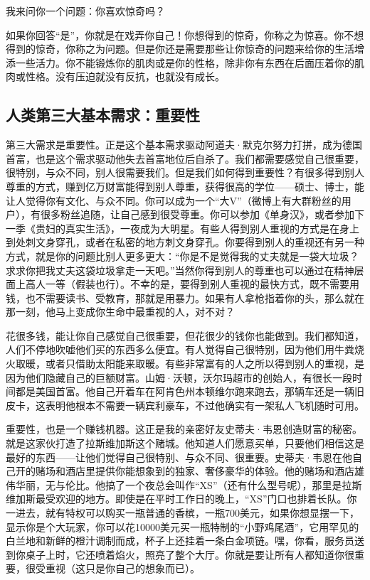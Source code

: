 我来问你一个问题：你喜欢惊奇吗？

如果你回答“是”，你就是在戏弄你自己！你想得到的惊奇，你称之为惊喜。你不想得到的惊奇，你称之为问题。但是你还是需要那些让你惊奇的问题来给你的生活增添一些活力。你不能锻炼你的肌肉或是你的性格，除非你有东西在后面压着你的肌肉或性格。没有压迫就没有反抗，也就没有成长。

\subsection{人类第三大基本需求：重要性}

第三大需求是重要性。正是这个基本需求驱动阿道夫·默克尔努力打拼，成为德国首富，也是这个需求驱动他失去首富地位后自杀了。我们都需要感觉自己很重要，很特别，与众不同，别人很需要我们。但是我们如何得到重要性？有很多得到别人尊重的方式，赚到亿万财富能得到别人尊重，获得很高的学位——硕士、博士，能让人觉得你有文化、与众不同。你可以成为一个“大V”（微博上有大群粉丝的用户），有很多粉丝追随，让自己感到很受尊重。你可以参加《单身汉》，或者参加下一季《贵妇的真实生活》，一夜成为大明星。有些人得到别人重视的方式是在身上到处刺文身穿孔，或者在私密的地方刺文身穿孔。你要得到别人的重视还有另一种方式，就是你的问题比别人更多更大：“你是不是觉得我的丈夫就是一袋大垃圾？求求你把我丈夫这袋垃圾拿走一天吧。”当然你得到别人的尊重也可以通过在精神层面上高人一等（假装也行）。不幸的是，要得到别人重视的最快方式，既不需要用钱，也不需要读书、受教育，那就是用暴力。如果有人拿枪指着你的头，那么就在那一刻，他马上变成你生命中最重视的人，对不对？

花很多钱，能让你自己感觉自己很重要，但花很少的钱你也能做到。我们都知道，人们不停地吹嘘他们买的东西多么便宜。有人觉得自己很特别，因为他们用牛粪烧火取暖，或者只借助太阳能来取暖。有些非常富有的人之所以得到别人的重视，是因为他们隐藏自己的巨额财富。山姆·沃顿，沃尔玛超市的创始人，有很长一段时间都是美国首富。他自己开着车在阿肯色州本顿维尔跑来跑去，那辆车还是一辆旧皮卡，这表明他根本不需要一辆宾利豪车，不过他确实有一架私人飞机随时可用。

重要性，也是一个赚钱机器。这正是我的亲密好友史蒂夫·韦恩创造财富的秘密。就是这家伙打造了拉斯维加斯这个赌城。他知道人们愿意买单，只要他们相信这是最好的东西——让他们觉得自己很特别、与众不同、很重要。史蒂夫·韦恩在他自己开的赌场和酒店里提供你能想象到的独家、奢侈豪华的体验。他的赌场和酒店雄伟华丽，无与伦比。他搞了一个夜总会叫作“XS”（还有什么型号呢），那里是拉斯维加斯最受欢迎的地方。即使是在平时工作日的晚上，“XS”门口也排着长队。你一进去，就有特权可以购买一瓶普通的香槟，一瓶700美元，如果你想显摆一下，显示你是个大玩家，你可以花10000美元买一瓶特制的“小野鸡尾酒”，它用罕见的白兰地和新鲜的橙汁调制而成，杯子上还挂着一条白金项链。嘿，你看，服务员送到你桌子上时，它还喷着焰火，照亮了整个大厅。你就是要让所有人都知道你很重要，很受重视（这只是你自己的想象而已）。

